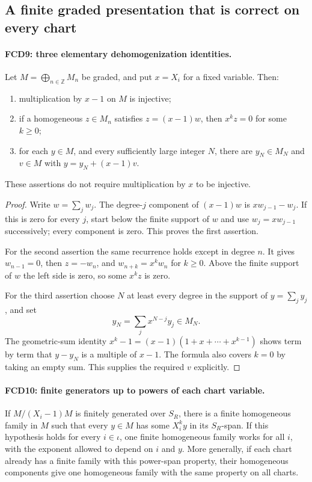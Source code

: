 \documentclass[11pt,a4paper]{article}
\numberwithin{equation}{section}
\theoremstyle{remark}\newtheorem{remark}[theorem]{Remark}
\begin{document}
\subsection{A finite graded presentation that is correct on every chart}

\paragraph{FCD9: three elementary dehomogenization identities.}
\label{claim:FCD9}
Let $M=\bigoplus_{n\in\mathbb Z}M_n$ be graded, and put
$x=X_i$ for a fixed variable.  Then:
\begin{enumerate}
\item multiplication by $x-1$ on $M$ is injective;
\item if a homogeneous $z\in M_n$ satisfies $z=(x-1)w$,
then $x^kz=0$ for some $k\ge0$;
\item for each $y\in M$, and every sufficiently large integer $N$,
there are $y_N\in M_N$ and $v\in M$ with $y=y_N+(x-1)v$.
\end{enumerate}
These assertions do not require multiplication by $x$ to be injective.

\begin{proof}
Write $w=\sum_jw_j$.  The degree-$j$ component of $(x-1)w$
is $xw_{j-1}-w_j$.  If this is zero for every $j$, start below
the finite support of $w$ and use $w_j=xw_{j-1}$ successively;
every component is zero.  This proves the first assertion.

For the second assertion the same recurrence holds except in degree
$n$.  It gives $w_{n-1}=0$, then $z=-w_n$, and
$w_{n+k}=x^kw_n$ for $k\ge0$.  Above the finite support of
$w$ the left side is zero, so some $x^kz$ is zero.

For the third assertion choose $N$ at least every degree in the
support of $y=\sum_jy_j$, and set
\[
 y_N=\sum_j x^{N-j}y_j\in M_N.
\]
The geometric-sum identity
$x^k-1=(x-1)(1+x+\cdots+x^{k-1})$ shows term by term that
$y-y_N$ is a multiple of $x-1$.  The formula also covers $k=0$
by taking an empty sum.  This supplies the required $v$ explicitly.
\end{proof}

\paragraph{FCD10: finite generators up to powers of each chart variable.}
\label{claim:FCD10}
If $M/(X_i-1)M$ is finitely generated over $S_R$, there is a
finite homogeneous family in $M$ such that every $y\in M$ has
some $X_i^ky$ in its $S_R$-span.  If this hypothesis holds for
every $i\in\iota$, one finite homogeneous family works for
all $i$, with the exponent allowed to depend on $i$ and $y$.
More generally, if each chart already has a finite family with
this power-span property, their homogeneous components give one
homogeneous family with the same property on all charts.
\end{document}
